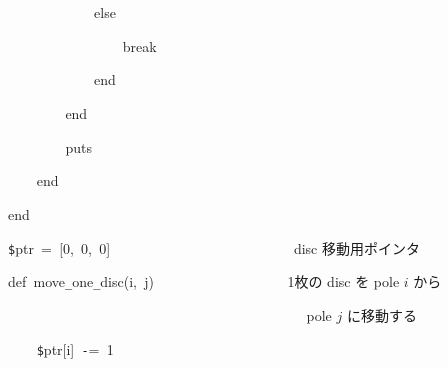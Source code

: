\documentclass[a4paper,10pt]{article}
\def\mc{\relax}
\begin{document}
\noindent
\mbox{}{\tt\mc \ }{\tt\mc \ }{\tt\mc \ }{\tt\mc \ }{\tt\mc \ }{\tt\mc \ }{\tt\mc \ }{\tt\mc \ }{\tt\mc \ }{\tt\mc \ }{\tt\mc \ }{\tt\mc \ }else

\noindent
\mbox{}{\tt\mc \ }{\tt\mc \ }{\tt\mc \ }{\tt\mc \ }{\tt\mc \ }{\tt\mc \ }{\tt\mc \ }{\tt\mc \ }{\tt\mc \ }{\tt\mc \ }{\tt\mc \ }{\tt\mc \ }{\tt\mc \ }{\tt\mc \ }{\tt\mc \ }{\tt\mc \ }break

\noindent
\mbox{}{\tt\mc \ }{\tt\mc \ }{\tt\mc \ }{\tt\mc \ }{\tt\mc \ }{\tt\mc \ }{\tt\mc \ }{\tt\mc \ }{\tt\mc \ }{\tt\mc \ }{\tt\mc \ }{\tt\mc \ }end

\noindent
\mbox{}{\tt\mc \ }{\tt\mc \ }{\tt\mc \ }{\tt\mc \ }{\tt\mc \ }{\tt\mc \ }{\tt\mc \ }{\tt\mc \ }end

\noindent
\mbox{}{\tt\mc \ }{\tt\mc \ }{\tt\mc \ }{\tt\mc \ }{\tt\mc \ }{\tt\mc \ }{\tt\mc \ }{\tt\mc \ }puts

\noindent
\mbox{}{\tt\mc \ }{\tt\mc \ }{\tt\mc \ }{\tt\mc \ }end

\noindent
\mbox{}end

\noindent
\mbox{}\hfill

\noindent
\mbox{}{\tt\$}ptr{\tt\mc \ }={\tt\mc \ }[0,{\tt\mc \ }0,{\tt\mc \ }0]{\tt\mc \ }{\tt\mc \ }{\tt\mc \ }{\tt\mc \ }{\tt\mc \ }{\tt\mc \ }{\tt\mc \ }{\tt\mc \ }{\tt\mc \ }{\tt\mc \ }{\tt\mc \ }{\tt\mc \ }{\tt\mc \ }{\tt\mc \ }{\tt\mc \ }{\tt\mc \ }{\tt\mc \ }{\tt\mc \ }{\tt\mc \ }{\tt\mc \ }{\tt\mc \ }{\tt\mc \ }{\tt\mc \ }{\tt\mc \ }\rm\mc {\tt\#} \ disc 移動用ポインタ \hfill 
\tt\mc 

\noindent
\mbox{}\hfill

\noindent
\mbox{}def{\tt\mc \ }move{\tt\_}one{\tt\_}disc(i,{\tt\mc \ }j){\tt\mc \ }{\tt\mc \ }{\tt\mc \ }{\tt\mc \ }{\tt\mc \ }{\tt\mc \ }{\tt\mc \ }{\tt\mc \ }{\tt\mc \ }{\tt\mc \ }{\tt\mc \ }{\tt\mc \ }{\tt\mc \ }{\tt\mc \ }{\tt\mc \ }{\tt\mc \ }{\tt\mc \ }\rm\mc {\tt\#} \ 1枚の disc を pole $i$ から \hfill 
\tt\mc 

\noindent
\mbox{}{\tt\mc \ }{\tt\mc \ }{\tt\mc \ }{\tt\mc \ }{\tt\mc \ }{\tt\mc \ }{\tt\mc \ }{\tt\mc \ }{\tt\mc \ }{\tt\mc \ }{\tt\mc \ }{\tt\mc \ }{\tt\mc \ }{\tt\mc \ }{\tt\mc \ }{\tt\mc \ }{\tt\mc \ }{\tt\mc \ }{\tt\mc \ }{\tt\mc \ }{\tt\mc \ }{\tt\mc \ }{\tt\mc \ }{\tt\mc \ }{\tt\mc \ }{\tt\mc \ }{\tt\mc \ }{\tt\mc \ }{\tt\mc \ }{\tt\mc \ }{\tt\mc \ }{\tt\mc \ }{\tt\mc \ }{\tt\mc \ }{\tt\mc \ }{\tt\mc \ }{\tt\mc \ }{\tt\mc \ }{\tt\mc \ }{\tt\mc \ }\rm\mc {\tt\#} \ pole $j$ に移動する \hfill 
\tt\mc 

\noindent
\mbox{}{\tt\mc \ }{\tt\mc \ }{\tt\mc \ }{\tt\mc \ }{\tt\$}ptr[i]{\tt\mc \ }{\tt -}={\tt\mc \ }1
\end{document}
